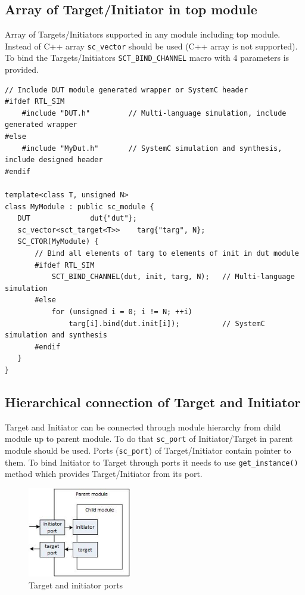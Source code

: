 \subsection{Array of Target/Initiator in top module}

Array of Targets/Initiators supported in any module including top module. Instead of C++ array {\tt sc\_vector} should be used (C++ array is not supported). To bind the Targets/Initiators {\tt SCT\_BIND\_CHANNEL} macro with 4 parameters is provided.

\begin{lstlisting}[style=mycpp]
// Include DUT module generated wrapper or SystemC header 
#ifdef RTL_SIM
    #include "DUT.h"         // Multi-language simulation, include generated wrapper
#else 
    #include "MyDut.h"       // SystemC simulation and synthesis, include designed header
#endif

template<class T, unsigned N>
class MyModule : public sc_module {
   DUT              dut{"dut"}; 
   sc_vector<sct_target<T>>    targ{"targ", N};
   SC_CTOR(MyModule) {
       // Bind all elements of targ to elements of init in dut module 
       #ifdef RTL_SIM
           SCT_BIND_CHANNEL(dut, init, targ, N);   // Multi-language simulation
       #else 
           for (unsigned i = 0; i != N; ++i)  
               targ[i].bind(dut.init[i]);          // SystemC simulation and synthesis
       #endif
   }
}
\end{lstlisting}

\subsection{Hierarchical connection of Target and Initiator}

Target and Initiator can be connected through module hierarchy from child module up to parent module. To do that {\tt sc\_port} of Initiator/Target in parent module should be used. Ports ({\tt sc\_port}) of Target/Initiator contain pointer to them. To bind Initiator to Target through ports it needs to use {\tt get\_instance()} method which provides Target/Initiator from its port.

\begin{figure}[!htb]
\centering
\includegraphics[width=0.4\textwidth]{pics/ss_parent_mod.jpg}
\caption{Target and initiator ports}
\label{fig:ss_parent_mod}
\end{figure}

